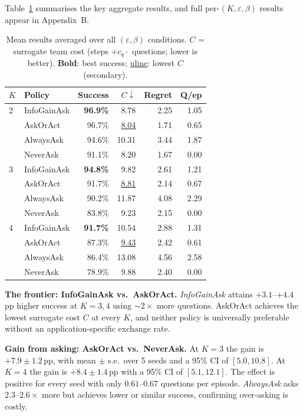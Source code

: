 \documentclass[10pt,twocolumn]{article}
\begin{document}
Table~\ref{tab:main} summarises the key aggregate results, and full per-$(K,\varepsilon,\beta)$ results appear in Appendix~B.

\begin{table}[h]
\centering
\caption{Mean results averaged over all $(\varepsilon, \beta)$ conditions. $C$ = surrogate team cost (steps $+ c_q {\cdot}$ questions; lower is better). \textbf{Bold}: best success; \underline{uline}: lowest $C$ (secondary).}
\label{tab:main}
\small
\begin{tabular}{llrrrr}
\toprule
$K$ & Policy & Success & $C\!\downarrow$ & Regret & Q/ep \\
\midrule
2 & InfoGainAsk & \textbf{96.9\%} & 8.78 & 2.25 & 1.05 \\
  & AskOrAct           & 96.7\%          & \underline{8.04} & 1.71 & 0.65 \\
  & AlwaysAsk          & 94.6\%          & 10.31 & 3.44 & 1.87 \\
  & NeverAsk           & 91.1\%          & 8.20 & 1.67 & 0.00 \\
\midrule
3 & InfoGainAsk & \textbf{94.8\%} & 9.82 & 2.61 & 1.21 \\
  & AskOrAct           & 91.7\%          & \underline{8.81} & 2.14 & 0.67 \\
  & AlwaysAsk          & 90.2\%          & 11.87 & 4.08 & 2.29 \\
  & NeverAsk           & 83.8\%          & 9.23 & 2.15 & 0.00 \\
\midrule
4 & InfoGainAsk & \textbf{91.7\%} & 10.54 & 2.88 & 1.31 \\
  & AskOrAct           & 87.3\%          & \underline{9.43} & 2.42 & 0.61 \\
  & AlwaysAsk          & 86.4\%          & 13.08 & 4.56 & 2.58 \\
  & NeverAsk           & 78.9\%          & 9.88 & 2.40 & 0.00 \\
\bottomrule
\end{tabular}
\end{table}

\textbf{The frontier: InfoGainAsk vs.\ AskOrAct.}
\textit{InfoGainAsk} attains $+3.1$--$+4.4$\,pp higher success at $K{=}3,4$ using ${\sim}2\times$ more questions.
AskOrAct achieves the lowest surrogate cost $C$ at every $K$, and neither policy is universally preferable without an application-specific exchange rate.

\textbf{Gain from asking: AskOrAct vs.\ NeverAsk.}
At $K{=}3$ the gain is $+7.9 \pm 1.2$\,pp, with mean $\pm$ s.e.\ over 5 seeds and a 95\% CI of $[5.0, 10.8]$.
At $K{=}4$ the gain is $+8.4 \pm 1.4$\,pp with a 95\% CI of $[5.1, 12.1]$.
The effect is positive for every seed with only $0.61$--$0.67$ questions per episode.
\textit{AlwaysAsk} asks $2.3$--$2.6\times$ more but achieves lower or similar success, confirming over-asking is costly.
\end{document}

